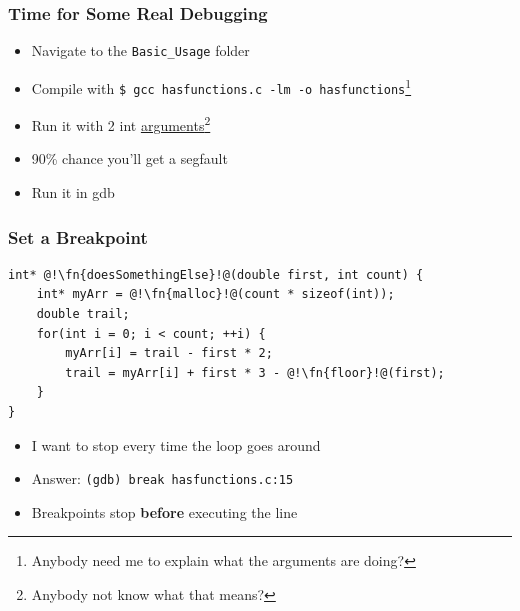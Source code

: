 \documentclass[aspectratio=169]{beamer}
\newcommand{\code}{\texttt}
\newcommand{\fn}{\color{identifier}}
\begin{document}
\begin{frame}
    \frametitle{Time for Some Real Debugging}

    \begin{itemize}
        \item Navigate to the \code{Basic\_Usage} folder
        \item Compile with \code{\$~gcc~hasfunctions.c~-lm~-o~hasfunctions}\footnote[frame]{Anybody need me to explain what the arguments are doing?}
        \item Run it with 2 int \underline{arguments}\footnote[frame]{Anybody not know what that means?}
        \pause
        \item 90\% chance you'll get a segfault
        \item Run it in gdb
    \end{itemize}

\end{frame}
\begin{frame}[fragile]
    \frametitle{Set a Breakpoint}
    \begin{lstlisting}[firstnumber=11,title={hasfunctions.c}]
int* @!\fn{doesSomethingElse}!@(double first, int count) {
    int* myArr = @!\fn{malloc}!@(count * sizeof(int));
    double trail;
    for(int i = 0; i < count; ++i) {
        myArr[i] = trail - first * 2;
        trail = myArr[i] + first * 3 - @!\fn{floor}!@(first);
    }
}
    \end{lstlisting}
    \begin{itemize}
        \item I want to stop every time the loop goes around
        \pause
        \item Answer: \code{(gdb) break hasfunctions.c:15}
        \item Breakpoints stop \textbf{before} executing the line
    \end{itemize}
\end{frame}
\end{document}
